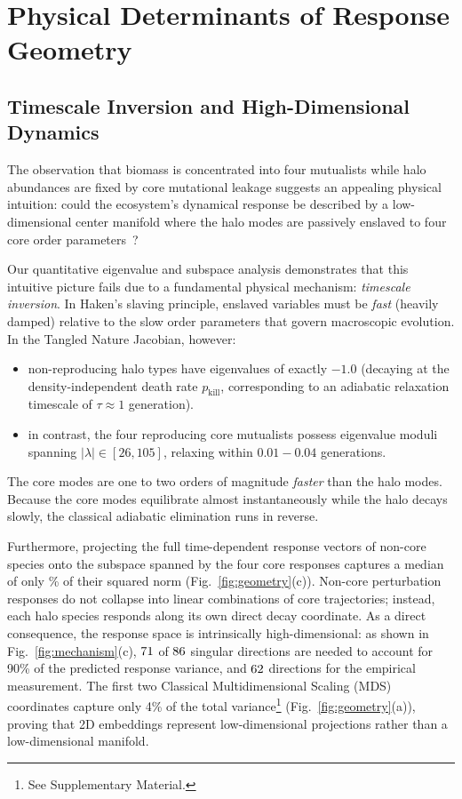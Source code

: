 \documentclass[twocolumn,amsmath,amssymb,aps,pra,10pt,floatfix,nofootinbib]{revtex4-2}
\begin{document}
\section{Physical Determinants of Response Geometry}
\label{sec:consequence}

\subsection{Timescale Inversion and High-Dimensional Dynamics}

The observation that biomass is concentrated into four mutualists while halo abundances are fixed by core mutational leakage suggests an appealing physical intuition: could the ecosystem's dynamical response be described by a low-dimensional center manifold where the halo modes are passively enslaved to four core order parameters~\cite{haken1983synergetics}?

Our quantitative eigenvalue and subspace analysis demonstrates that this intuitive picture fails due to a fundamental physical mechanism: \textit{timescale inversion}. In Haken's slaving principle, enslaved variables must be \emph{fast} (heavily damped) relative to the slow order parameters that govern macroscopic evolution. In the Tangled Nature Jacobian, however:
\begin{itemize}
    \item non-reproducing halo types have eigenvalues of exactly $-1.0$ (decaying at the density-independent death rate $p_{\text{kill}}$, corresponding to an adiabatic relaxation timescale of $\tau \approx 1$ generation).
    \item in contrast, the four reproducing core mutualists possess eigenvalue moduli spanning $|\lambda| \in [26, 105]$, relaxing within $0.01 - 0.04$ generations.
\end{itemize}
The core modes are one to two orders of magnitude \emph{faster} than the halo modes. Because the core modes equilibrate almost instantaneously while the halo decays slowly, the classical adiabatic elimination runs in reverse.

Furthermore, projecting the full time-dependent response vectors of non-core species onto the subspace spanned by the four core responses captures a median of only \coreFrac\% of their squared norm (Fig.~\ref{fig:geometry}(c)). Non-core perturbation responses do not collapse into linear combinations of core trajectories; instead, each halo species responds along its own direct decay coordinate. As a direct consequence, the response space is intrinsically high-dimensional: as shown in Fig.~\ref{fig:mechanism}(c), $71$ of $86$ singular directions are needed to account for 90\% of the predicted response variance, and $62$ directions for the empirical measurement. The first two Classical Multidimensional Scaling (MDS) coordinates capture only 4\% of the total variance\footnote[2]{See Supplementary Material.} (Fig.~\ref{fig:geometry}(a)), proving that 2D embeddings represent low-dimensional projections rather than a low-dimensional manifold.
\end{document}
